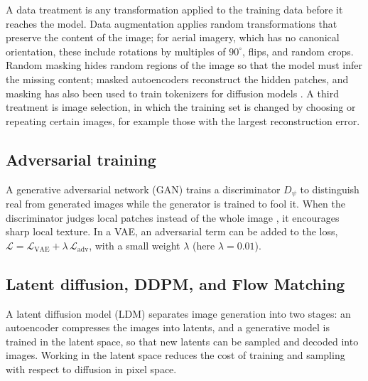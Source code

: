 A data treatment is any transformation applied to the training data before it reaches the model. Data augmentation applies random transformations that preserve the content of the image; for aerial imagery, which has no canonical orientation, these include rotations by multiples of $90^{\circ}$, flips, and random crops. Random masking hides random regions of the image so that the model must infer the missing content; masked autoencoders \cite{He2022} reconstruct the hidden patches, and masking has also been used to train tokenizers for diffusion models \cite{Chen2025}. A third treatment is image selection, in which the training set is changed by choosing or repeating certain images, for example those with the largest reconstruction error.

\subsection{Adversarial training}

A generative adversarial network (GAN) \cite{Goodfellow2014} trains a discriminator $D_\psi$ to distinguish real from generated images while the generator is trained to fool it. When the discriminator judges local patches instead of the whole image \cite{Isola2017}, it encourages sharp local texture. In a VAE, an adversarial term can be added to the loss, $\mathcal{L}=\mathcal{L}_{\mathrm{VAE}}+\lambda\,\mathcal{L}_{\mathrm{adv}}$, with a small weight $\lambda$ (here $\lambda=0.01$).

\subsection{Latent diffusion, DDPM, and Flow Matching}

A latent diffusion model (LDM) \cite{Rombach2022} separates image generation into two stages: an autoencoder compresses the images into latents, and a generative model is trained in the latent space, so that new latents can be sampled and decoded into images. Working in the latent space reduces the cost of training and sampling with respect to diffusion in pixel space.

